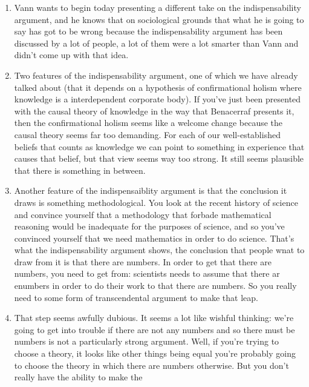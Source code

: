 \documentclass[12pt]{article}
\theoremstyle{definition}
\begin{document}
\begin{enumerate}
    \itemsep0em 
    \item
        Vann wants to begin today presenting a different take on the
        indispensability argument, and he knows that on sociological grounds
        that what he is going to say has got to be wrong because the
        indispensability argument has been discussed by a lot of people, a lot
        of them were a lot smarter than Vann and didn't come up with that idea. 
    \item
        Two features of the indispensability argument, one of which we have
        already talked about (that it depends on a hypothesis of confirmational
        holism where knowledge is a interdependent corporate body). If you've
        just been presented with the causal theory of knowledge in the way that
        Benacerraf presents it, then the confirmational holism seems like a
        welcome change because the causal theory seems far too demanding. For
        each of our well-established beliefs that counts as knowledge we can
        point to something in experience that causes that belief, but that view
        seems way too strong. It still seems plausible that there is something
        in between.
    \item
        Another feature of the indispensaiblity argument is that the conclusion
        it draws is something methodological. You look at the recent history of
        science and convince yourself that a methodology that forbade
        mathematical reasoning would be inadequate for the purposes of science,
        and so  you've convinced yourself that we need mathematics in order to
        do science. That's what the indispensability argument shows, the
        conclusion that people wnat to draw from it is that there are numbers.
        In order to get that there are numbers, you need to get from:
        scientists needs to assume that there ar enumbers in order to do their
        work to that there are numbers. So you really need to some form of
        transcendental argument to make that leap. 
    \item
        That step seems awfully dubious. It seems a lot like wishful thinking:
        we're going to get into trouble if there are not any numbers and so
        there must be numbers is not a particularly strong argument. Well, if
        you're trying to choose a theory, it looks like other things being
        equal you're probably going to choose the theory in which there are
        numbers otherwise. But you don't really have the ability to make the

\end{enumerate}
\end{document}
